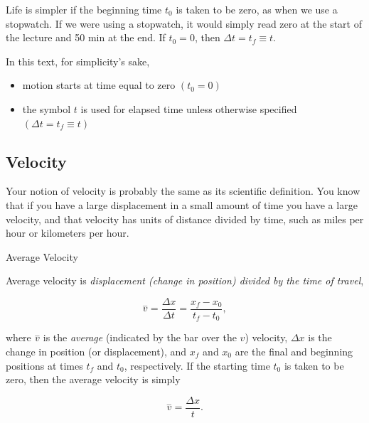 \documentclass[
]{book}
\providecommand{\tightlist}{%
  \setlength{\itemsep}{0pt}\setlength{\parskip}{0pt}}
\newenvironment{note}{}{}
\begin{document}
Life is simpler if the beginning time \(t_{0}{}\) is taken to be zero, as
when we use a stopwatch. If we were using a stopwatch, it would simply
read zero at the start of the lecture and 50 min at the end. If
\(t_{0} = 0\), then \({\Delta t = t_{f}} \equiv t\).

In this text, for simplicity's sake,

\begin{itemize}
\tightlist
\item
  \protect\hypertarget{import-auto-id2571110}{}{motion starts at time equal to zero
  \({({t_{0} = 0})}{}\)}
\item
  \protect\hypertarget{import-auto-id4047929}{}{the symbol \(t{}\) is used for elapsed time unless otherwise
  specified
  \({({{\Delta t = t_{f}} \equiv t})}{}\)}
\end{itemize}

\hypertarget{fs-id1850777}{}
\hypertarget{velocity}{%
\subsection{Velocity}\label{velocity}}

Your notion of velocity is probably the same as its scientific
definition. You know that if you have a large displacement in a small
amount of time you have a large velocity, and that velocity has units of
distance divided by time, such as miles per hour or kilometers per hour.

\hypertarget{fs-id3597968}{}
\begin{note}

Average Velocity

\protect\hypertarget{import-auto-id2596035}{}{Average velocity} is
\emph{displacement (change in position) divided by the time of travel},

\leavevmode\hypertarget{import-auto-id4059844}{}%
\[{{{\overset{-}{v} = \frac{\Delta x}{\Delta t}} = \frac{x_{f} - x_{0}}{t_{f} - t_{0}}},}{}\]

where \(\overset{-}{v}{}\) is the \emph{average} (indicated by the bar over the
\(v{}\)) velocity, \({\Delta x}{}\) is the change in position (or
displacement), and \(x_{f}{}\) and \(x_{0}\) are the final and beginning
positions at times \(t_{f}\) and \(t_{0}\), respectively. If the starting
time \(t_{0}\) is taken to be zero, then the average velocity is simply

\leavevmode\hypertarget{import-auto-id2027122}{}%
\[{{\overset{-}{v} = \frac{\Delta x}{t}}\text{.}}{}\]

\end{note}
\end{document}
